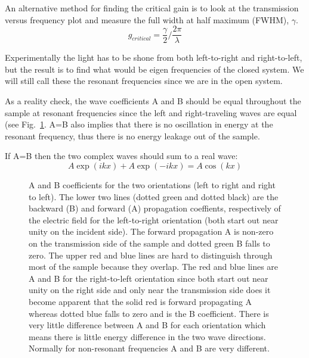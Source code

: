 An alternative method for finding the critical gain is to look at the transmission versus frequency plot and measure the full width at half maximum (FWHM), $\gamma$.
\begin{equation}
g_{critical} = \frac{\gamma}{2} / \frac{2 \pi}{ \lambda }
\end{equation}

Experimentally the light has to be shone from both left-to-right and right-to-left, but the result is to find what would be eigen frequencies of the closed system.  We will still call these the resonant frequencies since we are in the open system.

As a reality check, the wave coefficients A and B should be equal throughout the sample at resonant frequencies since the left and right-traveling waves are equal (see Fig.~\ref{fig:ABLRRLlog}.  A=B also implies that there is no oscillation in energy at the resonant frequency, thus there is no energy leakage out of the sample.

If A=B then the two complex waves should sum to a real wave:
\begin{equation}
A \exp(i k x)+A \exp(-i k x) = A \cos(k x)
\end{equation}

\begin{figure}
\vskip -0.5cm
\centerline{
}
\vskip -0.5cm
\caption{A and B coefficients for the two orientations (left to right and right to left). The lower two lines (dotted green and dotted black) are the backward (B) and forward (A) propagation coeffients, respectively of the electric field for the left-to-right orientation (both start out near unity on the incident side). The forward propagation A is non-zero on the transmission side of the sample and dotted green B falls to zero. The upper red and blue lines are hard to distinguish through most of the sample because they overlap. The red and blue lines are A and B for the right-to-left orientation since both start out near unity on the right side and only near the transmission side does it become apparent that the solid red is forward propagating A whereas dotted blue falls to zero and is the B coefficient. There is very little difference between A and B for each orientation which means there is little energy difference in the two wave directions. Normally for non-resonant frequencies A and B are very different.}
\label{fig:ABLRRLlog}
\end{figure}


